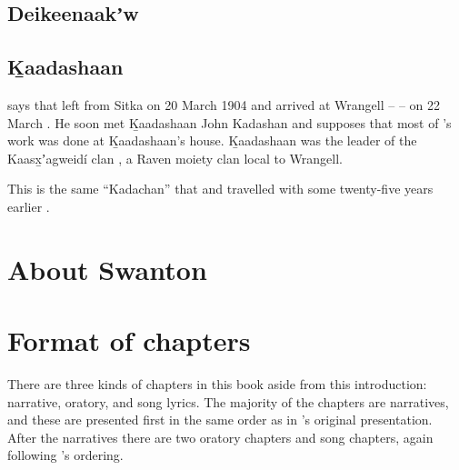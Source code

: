 


\subsection{Deikeenaakʼw}\label{sec:intro-speakers-deikeenaakw}

\subsection{Ḵaadashaan}\label{sec:intro-speakers-katishan}

\textcite{jones:2017} says that \citeauthor{swanton:1909} left from Sitka on 20 March 1904 and arrived at Wrangell –  – on 22 March \parencite[112 ff.]{jones:2017}.
He soon met Ḵaadashaan John Kadashan and \citeauthor{jones:2017} supposes that most of \citeauthor{swanton:1909}’s work was done at Ḵaadashaan’s house.
Ḵaadashaan was the leader of the Kaasx̱ʼagweidí clan \parencite[]{swanton:1908}, a Raven moiety clan local to Wrangell.

This is the same “Kadachan” that \textcite{muir:1915} and \textcite{young:1915} travelled with some twenty-five years earlier \parencite[160–165, 276 n.\ 36]{cruikshank:2005}. 

\section{About Swanton}\label{sec:intro-swanton}


\section{Format of chapters}\label{sec:intro-format}

There are three kinds of chapters in this book aside from this introduction: narrative, oratory, and song lyrics.
The majority of the chapters are narratives, and these are presented first in the same order as in \citeauthor{swanton:1909}’s original presentation.
After the narratives there are two oratory chapters and  song chapters, again following \citeauthor{swanton:1909}’s ordering.

